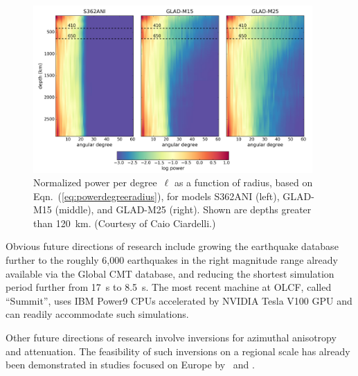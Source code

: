 \begin{figure}
  \centering
  \includegraphics[width=0.95\textwidth]{ch-GLADM25/figures/power_radius.pdf}
  \caption{\small{Normalized power per degree~$\ell$ as a function of radius, based on Eqn.~(\ref{eq:powerdegreeradius}), for models S362ANI (left), GLAD-M15 (middle), and GLAD-M25 (right).
  Shown are depths greater than 120~km.
  (Courtesy of Caio Ciardelli.)
  }}
  \label{fig:powerspectraradius}
\end{figure}


Obvious future directions of research include growing the earthquake database further to the roughly 6,000 earthquakes in the right magnitude range already available via the Global CMT database,
and reducing the shortest simulation period further from 17~s to 8.5~s.
The most recent machine at OLCF, called ``Summit'', uses IBM Power9 CPUs accelerated by NVIDIA Tesla V100 GPU and can readily accommodate such simulations.

Other future directions of research involve inversions for azimuthal anisotropy
and attenuation.
The feasibility of such inversions on a regional scale has already been demonstrated in studies focused on Europe by~\cite{ZhuTromp2013} and \cite{Zhuetal2013}.

